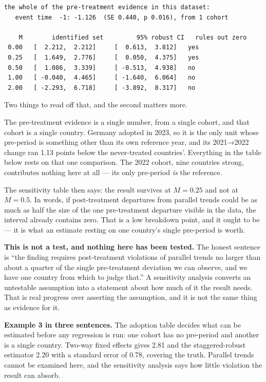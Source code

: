 \documentclass[
  letterpaper,
  10pt,
  twoside,
  openright,
  numbers=noenddot,
  chapterprefix=true]{scrbook}
\begin{document}
\begin{verbatim}
the whole of the pre-treatment evidence in this dataset:
   event time  -1: -1.126  (SE 0.440, p 0.016), from 1 cohort

    M        identified set         95% robust CI   rules out zero
 0.00   [  2.212,  2.212]     [  0.613,  3.812]   yes
 0.25   [  1.649,  2.776]     [  0.050,  4.375]   yes
 0.50   [  1.086,  3.339]     [ -0.513,  4.938]   no
 1.00   [ -0.040,  4.465]     [ -1.640,  6.064]   no
 2.00   [ -2.293,  6.718]     [ -3.892,  8.317]   no
\end{verbatim}

Two things to read off that, and the second matters more.

The pre-treatment evidence is a single number, from a single cohort, and
that cohort is a single country. Germany adopted in 2023, so it is the
only unit whose pre-period is something other than its own reference
year, and its 2021→2022 change ran 1.13 points below the never-treated
countries'. Everything in the table below rests on that one comparison.
The 2022 cohort, nine countries strong, contributes nothing here at all
--- its only pre-period \emph{is} the reference.

The sensitivity table then says: the result survives at \(M = 0.25\) and
not at \(M = 0.5\). In words, if post-treatment departures from parallel
trends could be as much as half the size of the one pre-treatment
departure visible in the data, the interval already contains zero. That
is a low breakdown point, and it ought to be --- it is what an estimate
resting on one country's single pre-period is worth.

\begin{qmibwarn}

\textbf{This is not a test, and nothing here has been tested.} The
honest sentence is ``the finding requires post-treatment violations of
parallel trends no larger than about a quarter of the single
pre-treatment deviation we can observe, and we have one country from
which to judge that.'' A sensitivity analysis converts an untestable
assumption into a statement about how much of it the result needs. That
is real progress over asserting the assumption, and it is not the same
thing as evidence for it.

\end{qmibwarn}

\textbf{Example 3 in three sentences.} The adoption table decides what
can be estimated before any regression is run: one cohort has no
pre-period and another is a single country. Two-way fixed effects gives
2.81 and the staggered-robust estimator 2.20 with a standard error of
0.78, covering the truth. Parallel trends cannot be examined here, and
the sensitivity analysis says how little violation the result can
absorb.
\end{document}
